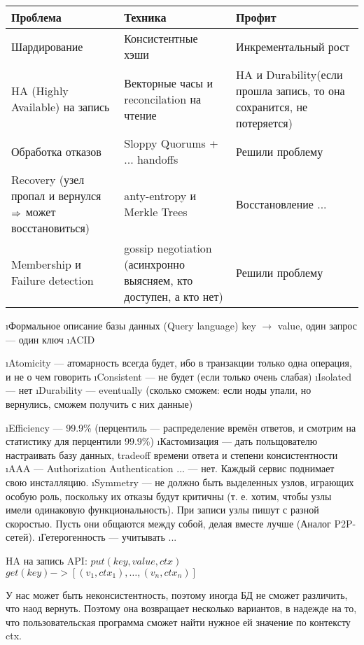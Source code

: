 \begin{tabular}{|l|l|l|}
Проблема & Техника & Профит \\ \hline
Шардирование & Консистентные хэши & Инкрементальный рост \\ \hline
HA (Highly Available) на запись & Векторные часы и reconcilation на чтение & HA и Durability(если прошла запись, то она сохранится, не потеряется)\\ \hline
Обработка отказов & Sloppy Quorums + ... handoffs & Решили проблему \\ \hline
Recovery (узел пропал и вернулся $\Rightarrow$ может восстановиться) & anty-entropy и Merkle Trees & Восстановление ... \\ \hline
Membership и Failure detection & gossip negotiation (асинхронно выясняем, кто доступен, а кто нет) & Решили проблему \\ \hline
\end{tabular}

\begin{enumerate}
\i Формальное описание базы данных (Query language)
key $\to$ value, один запрос --- один ключ
\i ACID 
\begin{enumerate}
\i Atomicity --- атомарность всегда будет, ибо в транзакции только одна операция, и не о чем говорить
\i Consistent --- не будет (если только очень слабая)
\i Isolated --- нет
\i Durability --- eventually (сколько сможем: если ноды упали, но вернулись, сможем получить с них данные)
\end{enumerate}
\i Efficiency --- 99.9\% (перцентиль --- распределение времён ответов, и смотрим на статистику для перцентили 99.9\%)
\i Кастомизация --- дать польщователю настраивать базу данных, tradeoff времени ответа и степени консистентности
\i AAA --- Authorization Authentication ... --- нет. Каждый сервис поднимает свою инсталляцию.
\i Symmetry --- не должно быть выделенных узлов, играющих особую роль, поскольку их отказы будут критичны (т. е. хотим, чтобы узлы имели одинаковую функциональность).
При записи узлы пишут с разной скоростью. Пусть они общаются между собой, делая вместе лучше (Аналог P2P-сетей).
\i Гетерогенность --- учитывать ...
\end{enumerate}
HA на запись
API: $put(key, value, ctx)$
$get(key) -> [(v_1, ctx_1), \dots, (v_n, ctx_n)]$

У нас может быть неконсистентность, поэтому иногда БД не сможет различить, что наод вернуть. Поэтому она возвращает несколько вариантов, в надежде на то, что пользовательская программа сможет найти нужное ей значение по контексту ctx.

